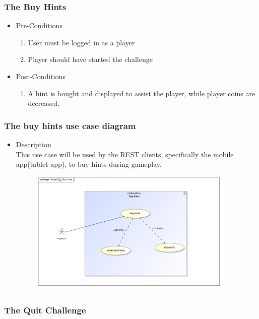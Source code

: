 \documentclass[english]{article}
\begin{document}
		\subsubsection{The Buy Hints}
		
			\begin{itemize}
	
		
		\item Pre-Conditions
			\begin{enumerate}
				
				\item User must be logged in as a player
				\item Player should have started the challenge
			\end{enumerate}
		\item Post-Conditions
			\begin{enumerate}
			\item A hint is bought and displayed to assist the player, while player coins are decreased.
						
			\end{enumerate}
	

		\end{itemize}
		
		
		\subsubsection* {The buy hints use case diagram}
		\begin{itemize}
			\item Description\\
			This use case will be used by the REST clients, specifically the mobile app(tablet app), to buy hints 
			during gameplay.
		\end{itemize}
		
	
		\includegraphics[width=14cm,height=6cm,keepaspectratio]{BuyHints.jpg}	
		
			\subsubsection{The Quit Challenge}
		
\end{document}
